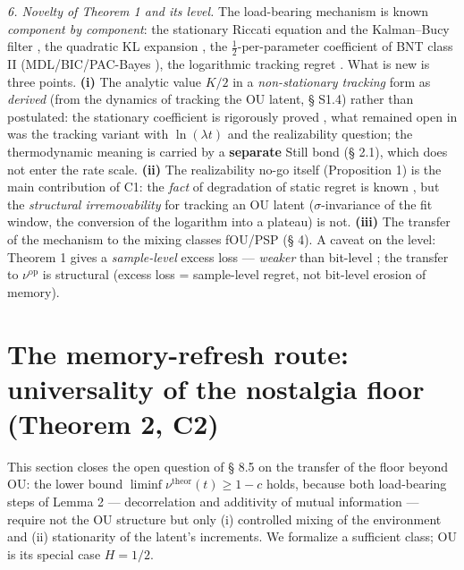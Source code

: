 \documentclass[12pt]{iopart}
\begin{document}
\emph{6. Novelty of Theorem 1 and its level.} The load-bearing mechanism is known \emph{component by component}: the stationary Riccati equation and the Kalman--Bucy filter \cite{KalmanBucy1961,AndersonMoore1979}, the quadratic KL expansion \cite{ClarkeBarron1990}, the \(\tfrac12\)-per-parameter coefficient of BNT class II \cite{BialekNemenmanTishby2001} (MDL/BIC/PAC-Bayes \cite{Rissanen1986,Schwarz1978,McAllester1999}), the logarithmic tracking regret \cite{Zinkevich2003,Hazan2007}. What is new is three points. \textbf{(i)} The analytic value \(K/2\) in a \emph{non-stationary tracking} form as \emph{derived} (from the dynamics of tracking the OU latent, § S1.4) rather than postulated: the stationary coefficient is rigorously proved \cite{ClarkeBarron1990,Rissanen1986}, what remained open in \cite{Andriishin2026b} was the tracking variant with \(\ln(\lambda t)\) and the realizability question; the thermodynamic meaning is carried by a \textbf{separate} Still bond (§ 2.1), which does not enter the rate scale. \textbf{(ii)} The realizability no-go itself (Proposition 1) is the main contribution of C1: the \emph{fact} of degradation of static regret is known \cite{HazanSeshadhri2009,Daniely2015}, but the \emph{structural irremovability} for tracking an OU latent (\(\sigma\)-invariance of the fit window, the conversion of the logarithm into a plateau) is not. \textbf{(iii)} The transfer of the mechanism to the mixing classes fOU/PSP (§ 4). A caveat on the level: Theorem 1 gives a \emph{sample-level} excess loss --- \emph{weaker} than bit-level \cite{Andriishin2026b}; the transfer to \(\nu^{\text{op}}\) is structural (excess loss = sample-level regret, not bit-level erosion of memory).



\section{The memory-refresh route: universality of the nostalgia floor (Theorem 2, C2)}\label{the-memory-refresh-route-universality-of-the-nostalgia-floor-theorem-2-c2}



This section closes the open question of § 8.5 \cite{Andriishin2026b} on the transfer of the floor beyond OU: the lower bound \(\liminf\nu^{\text{theor}}(t) \ge 1-c\) holds, because both load-bearing steps of Lemma 2 --- decorrelation and additivity of mutual information --- require not the OU structure but only (i) controlled mixing of the environment and (ii) stationarity of the latent's increments. We formalize a sufficient class; OU is its special case \(H = 1/2\).
\end{document}
